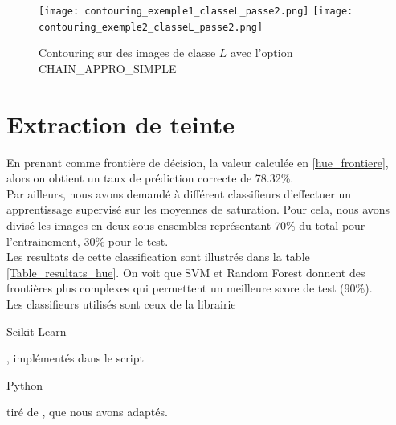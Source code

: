 \documentclass{book}
\begin{document}
\begin{figure}[H]
\begin{center}
\texttt{[image: contouring\_exemple1\_classeL\_passe2.png]}
\texttt{[image: contouring\_exemple2\_classeL\_passe2.png]}
\end{center}
\caption{Contouring sur des images de classe $L$ avec l'option CHAIN\_APPRO\_SIMPLE}
\label{contouringL2}
\end{figure}

\section{Extraction de teinte}
En prenant comme frontière de décision, la valeur calculée en \ref{hue_frontiere}, alors on obtient un taux de prédiction correcte de 78.32\%.\\
Par ailleurs, nous avons demandé à différent classifieurs d'effectuer un apprentissage supervisé sur les moyennes de saturation. Pour cela, nous avons divisé les images
en deux sous-ensembles représentant 70\% du total pour l'entrainement, 30\% pour le test.\\
Les resultats de cette classification sont illustrés dans la table \ref{Table_resultats_hue}. On voit que SVM et Random Forest donnent des frontières plus complexes qui permettent
un meilleure score de test (90\%).\\
Les classifieurs utilisés sont ceux de la librairie \begin{itshape}Scikit-Learn\end{itshape}, implémentés dans le script 
\begin{itshape}Python\end{itshape} tiré de \cite{scikit_bench}, que nous avons adaptés.
\end{document}
